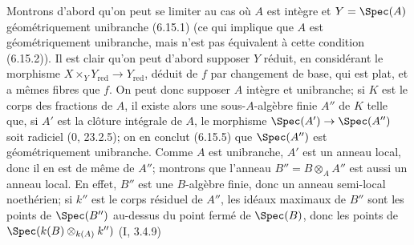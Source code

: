 Montrons d'abord qu'on peut se limiter au cas où $A$ est intègre et $Y=\Spec(A)$ géométriquement unibranche (6.15.1) (ce qui implique que $A$ est géométriquement unibranche, mais n'est pas équivalent à cette condition (6.15.2)). Il est clair qu'on peut d'abord supposer $Y$ réduit, en considérant le morphisme $X\times_Y Y_{\mathrm{red}}\to Y_{\mathrm{red}}$, déduit de $f$ par changement de base, qui est plat, et a mêmes fibres que $f$. On peut donc supposer $A$ intègre et unibranche; si $K$ est le corps des fractions de $A$, il existe alors une sous-$A$-algèbre finie $A''$ de $K$ telle que, si $A'$ est la clôture intégrale de $A$, le morphisme $\Spec(A')\to\Spec(A'')$ soit radiciel (0, 23.2.5); on en conclut (6.15.5) que $\Spec(A'')$ est géométriquement unibranche. Comme $A$ est unibranche, $A'$ est un anneau local, donc il en est de même de $A''$; montrons que l'anneau $B''=B\otimes_A A''$ est aussi un anneau local. En effet, $B''$ est une $B$-algèbre finie, donc un anneau semi-local noethérien; si $k''$ est le corps résiduel de $A''$, les idéaux maximaux de $B''$ sont les points de $\Spec(B'')$ au-dessus du point fermé de $\Spec(B)$, donc les points de $\Spec(k(B)\otimes_{k(A)}k'')$ (I, 3.4.9)

